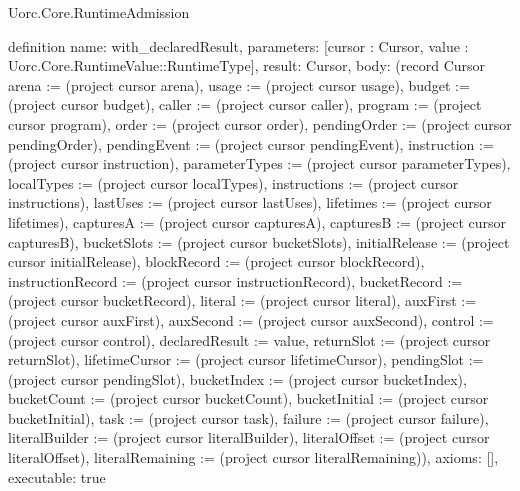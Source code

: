 \begin{lexlean}{Uorc.Core.RuntimeAdmission}
\begin{semanticmodule}
definition{
  name: with_declaredResult,
  parameters: [cursor : Cursor, value : Uorc.Core.RuntimeValue::RuntimeType],
  result: Cursor,
  body: (record Cursor {arena := (project cursor arena), usage := (project cursor usage), budget := (project cursor budget), caller := (project cursor caller), program := (project cursor program), order := (project cursor order), pendingOrder := (project cursor pendingOrder), pendingEvent := (project cursor pendingEvent), instruction := (project cursor instruction), parameterTypes := (project cursor parameterTypes), localTypes := (project cursor localTypes), instructions := (project cursor instructions), lastUses := (project cursor lastUses), lifetimes := (project cursor lifetimes), capturesA := (project cursor capturesA), capturesB := (project cursor capturesB), bucketSlots := (project cursor bucketSlots), initialRelease := (project cursor initialRelease), blockRecord := (project cursor blockRecord), instructionRecord := (project cursor instructionRecord), bucketRecord := (project cursor bucketRecord), literal := (project cursor literal), auxFirst := (project cursor auxFirst), auxSecond := (project cursor auxSecond), control := (project cursor control), declaredResult := value, returnSlot := (project cursor returnSlot), lifetimeCursor := (project cursor lifetimeCursor), pendingSlot := (project cursor pendingSlot), bucketIndex := (project cursor bucketIndex), bucketCount := (project cursor bucketCount), bucketInitial := (project cursor bucketInitial), task := (project cursor task), failure := (project cursor failure), literalBuilder := (project cursor literalBuilder), literalOffset := (project cursor literalOffset), literalRemaining := (project cursor literalRemaining)}),
  axioms: [],
  executable: true
}


\end{semanticmodule}
\end{lexlean}
